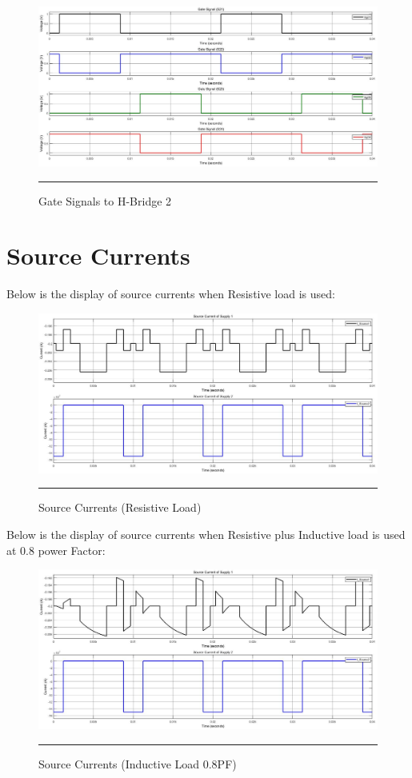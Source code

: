 \begin{figure}[htbp]
	\centering
	\includegraphics[width = 6in]{./Figures/Photos/Simulink/GateSignal2.jpg}
	\rule{35em}{1pt}
	\caption{Gate Signals to H-Bridge 2}
\end{figure}

\section{Source Currents}
Below is the display of source currents when Resistive load is used:
\begin{figure}[htbp]
	\centering
	\includegraphics[width = 6in]{./Figures/Photos/Simulink/Source_Current_Res.jpg}
	\rule{35em}{1pt}
	\caption{Source Currents (Resistive Load)}
\end{figure}
\newpage
Below is the display of source currents when Resistive plus Inductive load is used at 0.8 power Factor:
\begin{figure}[htbp]
	\centering
	\includegraphics[width = 6in]{./Figures/Photos/Simulink/Source_Current_Induc.jpg}
	\rule{35em}{1pt}
	\caption{Source Currents (Inductive Load 0.8PF)}
\end{figure}

